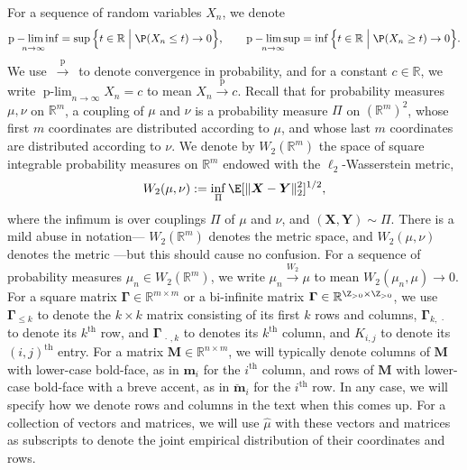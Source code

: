 \documentclass[]{article}
\def\bX{{\boldsymbol X}}
\def\bGamma{\boldsymbol{\Gamma}}
\def\bM{{\boldsymbol M}}
\def\reals{{\mathbb R}}
\def\bY{{\boldsymbol Y}}
\def\bbm{{\boldsymbol m}}
\def\muhat{\widehat{\mu}{}}
\def\pconv{\stackrel{\mathrm{p}}\rightarrow}
\def\Wconv{\stackrel{W_2}\rightarrow}
\def\brevebm{\breve{\boldsymbol{m}}{}}
\DeclareMathOperator*{\plim}{p-lim}
\DeclareMathOperator*{\plimsup}{p-lim\,sup}
\DeclareMathOperator*{\pliminf}{p-lim\,inf}
\begin{document}
For a sequence of random variables $X_n$,
we denote
\begin{equation}
    \pliminf_{n \rightarrow \infty}
        = \sup \Big\{ 
            t \in \reals 
            \Bigm| 
            \P(X_n \leq t) \rightarrow 0
        \Big\},
    \qquad 
    \plimsup_{n \rightarrow \infty}
        = \inf \Big\{ 
            t \in \reals 
            \Bigm| 
            \P(X_n \geq t) \rightarrow 0
        \Big\}.
\end{equation}
We use $\,\pconv\,$ to denote convergence in probability, 
and for a constant $c \in \reals$, we write $\plim_{n \rightarrow \infty} X_n = c$ to mean $X_n \pconv c$.
Recall that for probability measures $\mu,\nu$ on $\reals^m$,
a coupling of $\mu$ and $\nu$ is a probability measure $\Pi$ on $(\reals^m)^2$,
whose first $m$ coordinates are distributed according to $\mu$,
and whose last $m$ coordinates are distributed according to $\nu$.
We denote by $W_2(\reals^m)$ the space of square integrable probability measures on $\reals^m$ endowed with the $\ell_2$-Wasserstein metric,
\begin{equation}
    W_2(\mu,\nu)
        :=
        \inf_{\Pi}
            \E[\| \bX - \bY \|_2^2]^{1/2},
\end{equation}
where the infimum is over couplings $\Pi$ of $\mu$ and $\nu$, and $(\bX,\bY) \sim \Pi$.
There is a mild abuse in notation--- $W_2(\reals^m)$ denotes the metric space, and $W_2(\mu,\nu)$ denotes the metric ---but this should cause no confusion.
For a sequence of probability measures $\mu_n \in W_2(\reals^m)$,
we write $\mu_n \Wconv \mu$ to mean $W_2(\mu_n,\mu) \rightarrow 0$.
For a square matrix $\bGamma \in \reals^{m \times m}$ or a bi-infinite matrix $\bGamma \in \reals^{\Z_{>0} \times \Z_{> 0}}$,
we use $\bGamma_{\leq k}$ to denote the $k\times k$ matrix consisting of its first $k$ rows and columns, $\bGamma_{k,\,\cdot\,}$ to denote its $k^\text{th}$ row, and $\bGamma_{\,\cdot\,,k}$ to denotes its $k^\text{th}$ column, and $K_{i,j}$ to denote its $(i,j)^{\text{th}}$ entry.
For a matrix $\bM \in \reals^{n \times m}$, 
we will typically denote columns of $\bM$ with lower-case bold-face, as in $\bbm_i$ for the $i^\text{th}$ column,
and rows of $\bM$ with lower-case bold-face with a breve accent, as in $\brevebm_i$ for the $i^\text{th}$ row.
In any case, we will specify how we denote rows and columns in the text when this comes up.
For a collection of vectors and matrices, we will use $\muhat$ with these vectors and matrices as subscripts to denote the joint empirical distribution of their coordinates and rows. 
\end{document}
